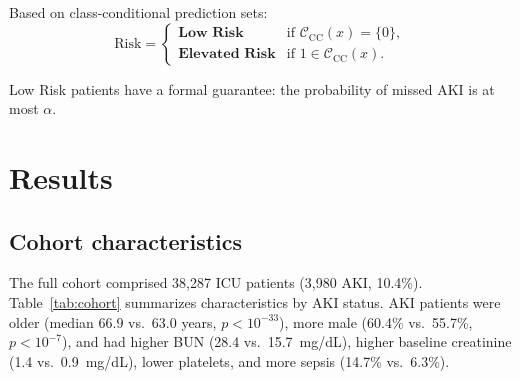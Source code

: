 \documentclass[12pt]{article}
\begin{document}
Based on class-conditional prediction sets:
\begin{equation}
\text{Risk} = \begin{cases}
\textbf{Low Risk}      & \text{if } \mathcal{C}_{\mathrm{CC}}(x)
  = \{0\}, \\
\textbf{Elevated Risk} & \text{if } 1 \in
  \mathcal{C}_{\mathrm{CC}}(x).
\end{cases}
\label{eq:risk}
\end{equation}

Low Risk patients have a formal guarantee: the probability of
missed AKI is at most $\alpha$.


\section{Results}
\label{sec:results}

\subsection{Cohort characteristics}
\label{sec:cohort}

The full cohort comprised 38{,}287 ICU patients (3{,}980 AKI,
10.4\%).  Table~\ref{tab:cohort} summarizes characteristics by
AKI status.  AKI patients were older (median 66.9 vs.\ 63.0
years, $p < 10^{-33}$), more male (60.4\% vs.\ 55.7\%,
$p < 10^{-7}$), and had higher BUN (28.4 vs.\ 15.7~mg/dL),
higher baseline creatinine (1.4 vs.\ 0.9~mg/dL), lower
platelets, and more sepsis (14.7\% vs.\ 6.3\%).
\end{document}

